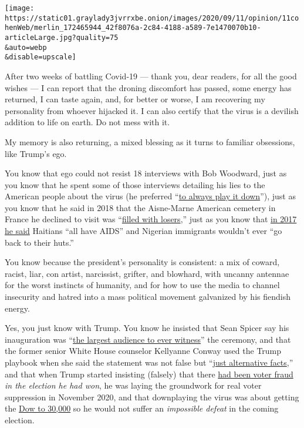 \texttt{[image: https://static01.graylady3jvrrxbe.onion/images/2020/09/11/opinion/11cohenWeb/merlin\_172465944\_42f8076a-2c84-4188-a589-7e1470070b10-articleLarge.jpg?quality=75\\\&auto=webp\\\&disable=upscale]}

After two weeks of battling Covid-19 --- thank you, dear readers, for
all the good wishes --- I can report that the droning discomfort has
passed, some energy has returned, I can taste again, and, for better or
worse, I am recovering my personality from whoever hijacked it. I can
also certify that the virus is a devilish addition to life on earth. Do
not mess with it.

My memory is also returning, a mixed blessing as it turns to familiar
obsessions, like Trump's ego.

You know that ego could not resist 18 interviews with Bob Woodward, just
as you know that he spent some of those interviews detailing his lies to
the American people about the virus (he preferred
``\href{https://www.newyorker.com/news/letter-from-trumps-washington/bob-woodward-finally-got-trump-to-tell-the-truth-about-covid-19}{to
always play it down}''), just as you know that he said in 2018 that the
Aisne-Marne American cemetery in France he declined to visit was
``\href{https://www.theatlantic.com/politics/archive/2020/09/trump-americans-who-died-at-war-are-losers-and-suckers/615997/}{filled
with losers},'' just as you know that
\href{https://www.nytimes3xbfgragh.onion/2017/12/23/us/politics/trump-immigration.html}{in
2017 he said} Haitians ``all have AIDS'' and Nigerian immigrants
wouldn't ever ``go back to their huts.''

You know because the president's personality is consistent: a mix of
coward, racist, liar, con artist, narcissist, grifter, and blowhard,
with uncanny antennae for the worst instincts of humanity, and for how
to use the media to channel insecurity and hatred into a mass political
movement galvanized by his fiendish energy.

Yes, you just know with Trump. You know he insisted that Sean Spicer say
his inauguration was
``\href{https://www.washingtonpost.com/news/the-fix/wp/2017/06/20/sean-spicer-may-be-done-with-press-briefings-here-are-his-greatest-hits/}{the
largest audience to ever witness}'' the ceremony, and that the former
senior White House counselor Kellyanne Conway used the Trump playbook
when she said the statement was not false but
``\href{https://www.nbcnews.com/meet-the-press/video/conway-press-secretary-gave-alternative-facts-860142147643}{just
alternative facts},'' and that when Trump started insisting (falsely)
that there
\href{https://apnews.com/f5f6a73b2af546ee97816bb35e82c18d/Report:-Trump-commission-did-not-find-widespread-voter-fraud}{had
been voter fraud} \emph{in the election he had won}, he was laying the
groundwork for real voter suppression in November 2020, and that
downplaying the virus was about getting the
\href{https://www.nytimes3xbfgragh.onion/2020/04/17/opinion/trump-coronavirus.html}{Dow
to 30,000} so he would not suffer an \emph{impossible defeat} in the
coming election.

